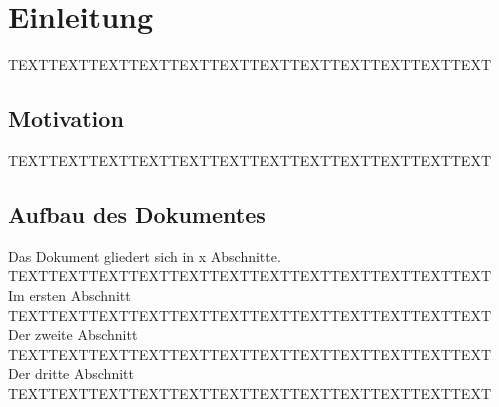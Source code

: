 \chapter{Einleitung}
TEXTTEXTTEXTTEXTTEXTTEXTTEXTTEXTTEXTTEXTTEXTTEXT

\section*{Motivation}
TEXTTEXTTEXTTEXTTEXTTEXTTEXTTEXTTEXTTEXTTEXTTEXT

\section*{Aufbau des Dokumentes}
Das Dokument gliedert sich in x Abschnitte.\\
TEXTTEXTTEXTTEXTTEXTTEXTTEXTTEXTTEXTTEXTTEXTTEXT
\\
Im ersten Abschnitt \\
TEXTTEXTTEXTTEXTTEXTTEXTTEXTTEXTTEXTTEXTTEXTTEXT
\\
Der zweite Abschnitt \\
TEXTTEXTTEXTTEXTTEXTTEXTTEXTTEXTTEXTTEXTTEXTTEXT
\\
Der dritte Abschnitt \\
TEXTTEXTTEXTTEXTTEXTTEXTTEXTTEXTTEXTTEXTTEXTTEXT